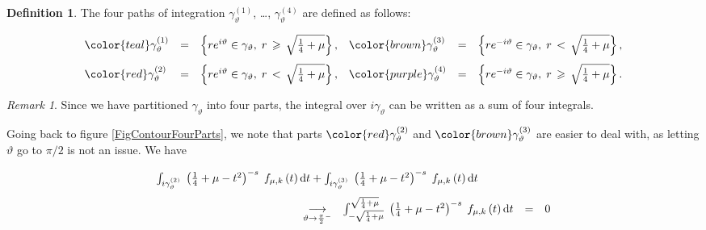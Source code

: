 \documentclass{jams-l}
\theoremstyle{definition}
\newtheorem{definition}[theorem]{Definition}
\theoremstyle{remark}
\newtheorem{remark}[theorem]{Remark}
\numberwithin{equation}{section}
\begin{document}
        \begin{definition}
        
            The four paths of integration $\gamma_{\vartheta}^{\left( 1 \right)}$, \dots, $\gamma_{\vartheta}^{\left( 4 \right)}$ are defined as follows:
            
            \[ \begin{array}{llllll}
                    \color{teal} \gamma_{\vartheta}^{\left( 1 \right)} & = & \left \{ r e^{i \vartheta} \in \gamma_{\vartheta}, \; r \, \geqslant \, \sqrt{\frac{1}{4} + \mu} \right \}, & \color{brown} \gamma_{\vartheta}^{\left( 3 \right)} & = & \left \{ r e^{-i \vartheta} \in \gamma_{\vartheta}, \; r \, < \, \sqrt{\frac{1}{4} + \mu} \right \}, \\[1em]
                    
                    
                    
                    \color{red} \gamma_{\vartheta}^{\left( 2 \right)} & = & \left \{ r e^{i \vartheta} \in \gamma_{\vartheta}, \; r \, < \, \sqrt{\frac{1}{4} + \mu} \right \}, & \color{purple} \gamma_{\vartheta}^{\left( 4 \right)} & = & \left \{ r e^{- i \vartheta} \in \gamma_{\vartheta}, \; r \, \geqslant \, \sqrt{\frac{1}{4} + \mu} \right \}.
                    
                    
                \end{array} \]
        
        \end{definition}
        
        \begin{remark}
        
            Since we have partitioned $\gamma_{\vartheta}$ into four parts, the integral over $i \gamma_{\vartheta}$ can be written as a sum of four integrals.
        
        \end{remark}
        
        Going back to figure \ref{FigContourFourParts}, we note that parts $\color{red} \gamma_{\vartheta}^{\left( 2 \right)}$ and $\color{brown} \gamma_{\vartheta}^{\left( 3 \right)}$ are easier to deal with, as letting $\vartheta$ go to $\pi/2$ is not an issue. We have
        
        \[ \begin{array}{lllll}
                \multicolumn{5}{l}{\int_{i \gamma_{\vartheta}^{\left( 2 \right)}} \; \left( \frac{1}{4} + \mu - t^2 \right)^{-s} \; f_{\mu,k} \left( t \right) \text{d}t + \int_{i \gamma_{\vartheta}^{\left( 3 \right)}} \; \left( \frac{1}{4} + \mu - t^2 \right)^{-s} \; f_{\mu,k} \left( t \right) \text{d}t} \\[1em]
                
                \qquad \qquad \qquad \qquad \qquad \qquad & \underset{\vartheta \rightarrow \frac{\pi}{2}^{-}}{\longrightarrow} & \int_{- \sqrt{\frac{1}{4}+\mu}}^{\sqrt{\frac{1}{4}+\mu}} \; \left( \frac{1}{4} + \mu - t^2 \right)^{-s} \; f_{\mu,k} \left( t \right) \text{d}t & = & 0
            \end{array} \]
        
\end{document}
